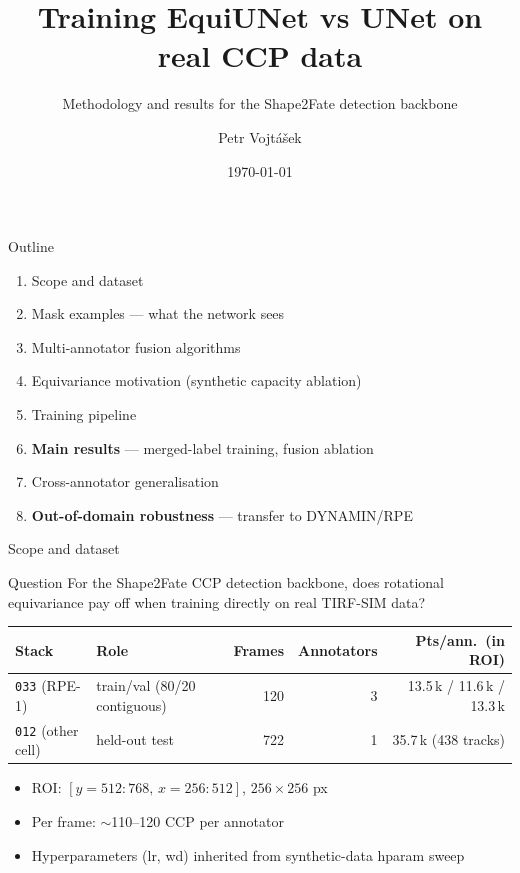 \documentclass[10pt,aspectratio=169]{beamer}
\title{Training EquiUNet vs UNet on real CCP data}
\subtitle{Methodology and results for the Shape2Fate detection backbone}
\author{Petr Vojtášek}
\date{\today}
\newcommand{\hilite}[1]{\textbf{\color{blue!60!black}#1}}
\begin{document}
\begin{frame}[plain]
  \titlepage
\end{frame}

\begin{frame}{Outline}
  \begin{enumerate}\setlength\itemsep{3pt}
    \item Scope and dataset
    \item Mask examples --- what the network sees
    \item Multi-annotator fusion algorithms
    \item Equivariance motivation (synthetic capacity ablation)
    \item Training pipeline
    \item \hilite{Main results} --- merged-label training, fusion ablation
    \item Cross-annotator generalisation
    \item \hilite{Out-of-domain robustness} --- transfer to DYNAMIN/RPE
  \end{enumerate}
\end{frame}

\begin{frame}{Scope and dataset}
  \begin{block}{Question}
    For the Shape2Fate CCP detection backbone, does rotational equivariance
    pay off when training directly on real TIRF-SIM data?
  \end{block}

  \vspace{1mm}
  \centering
  \footnotesize
  \begin{tabular}{l l r r r}
    \toprule
    Stack & Role & Frames & Annotators & Pts/ann.\ (in ROI) \\
    \midrule
    \texttt{033} (RPE-1)     & train/val (80/20 contiguous) & 120 & 3 & 13.5\,k / 11.6\,k / 13.3\,k \\
    \texttt{012} (other cell) & held-out test                & 722 & 1 & 35.7\,k (438 tracks) \\
    \bottomrule
  \end{tabular}
  \normalsize

  \vspace{2mm}
  \begin{itemize}\setlength\itemsep{2pt}
    \item ROI: $[y\!=\!512{:}768,\,x\!=\!256{:}512]$, $256{\times}256$ px
    \item Per frame: $\sim$110--120 CCP per annotator
    \item Hyperparameters (lr, wd) inherited from synthetic-data hparam sweep
  \end{itemize}
\end{frame}
\end{document}
